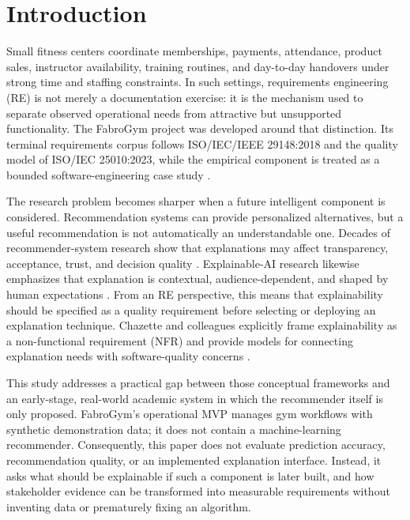 \documentclass[pdflatex,sn-basic]{sn-jnl}
\begin{document}

\maketitle

\section{Introduction}\label{sec:intro}
Small fitness centers coordinate memberships, payments, attendance, product sales, instructor availability, training routines, and day-to-day handovers under strong time and staffing constraints. In such settings, requirements engineering (RE) is not merely a documentation exercise: it is the mechanism used to separate observed operational needs from attractive but unsupported functionality. The FabroGym project was developed around that distinction. Its terminal requirements corpus follows ISO/IEC/IEEE 29148:2018 and the quality model of ISO/IEC 25010:2023, while the empirical component is treated as a bounded software-engineering case study \cite{iso29148,iso25010,pohl2010,swebok2024,runeson2009,wohlin2012}.

The research problem becomes sharper when a future intelligent component is considered. Recommendation systems can provide personalized alternatives, but a useful recommendation is not automatically an understandable one. Decades of recommender-system research show that explanations may affect transparency, acceptance, trust, and decision quality \cite{herlocker2000,gedikli2014,zhangchen2020}. Explainable-AI research likewise emphasizes that explanation is contextual, audience-dependent, and shaped by human expectations \cite{miller2019,ribeiro2016,sokol2020}. From an RE perspective, this means that explainability should be specified as a quality requirement before selecting or deploying an explanation technique. Chazette and colleagues explicitly frame explainability as a non-functional requirement (NFR) and provide models for connecting explanation needs with software-quality concerns \cite{chazette2020,chazette2021,chazette2022}.

This study addresses a practical gap between those conceptual frameworks and an early-stage, real-world academic system in which the recommender itself is only proposed. FabroGym's operational MVP manages gym workflows with synthetic demonstration data; it does not contain a machine-learning recommender. Consequently, this paper does not evaluate prediction accuracy, recommendation quality, or an implemented explanation interface. Instead, it asks what should be explainable if such a component is later built, and how stakeholder evidence can be transformed into measurable requirements without inventing data or prematurely fixing an algorithm.
\end{document}
